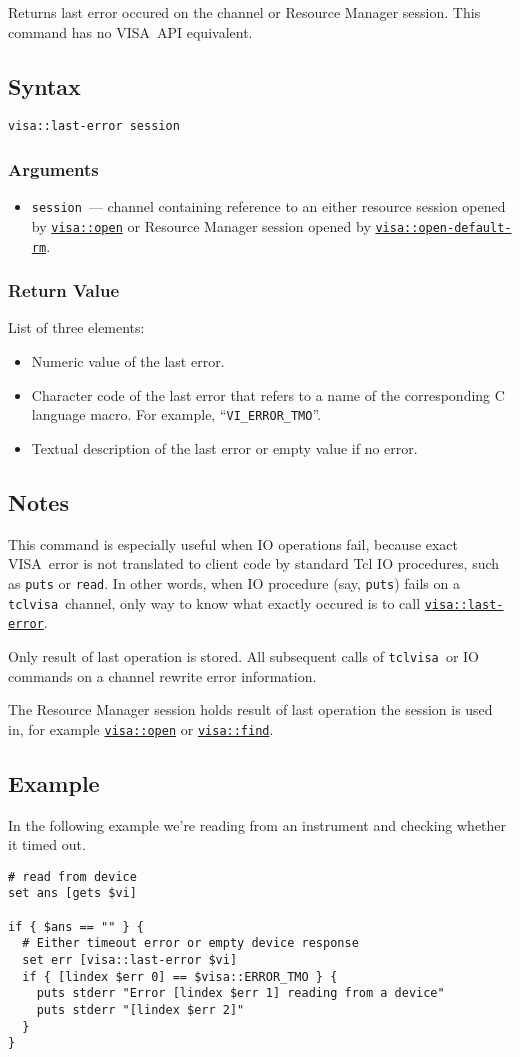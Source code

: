 \documentclass[12pt, a4paper]{report}
\newcommand{\tclvisa}{{\tt tclvisa }}
\newcommand{\VISA}{\mbox{VISA }}
\newcommand{\COMMANDREF}[1]{{\tt \hyperref[#1]{#1}}}
\newcommand{\TCLCOMMANDREF}[1]{{\tt \mbox{#1}}\index{#1}}
\newcommand{\EXAMPLE}{\subsection*{Example}}
\newcommand{\SYNTAX}[1]{\subsection*{Syntax}{\tt #1}}
\newcommand{\NOTES}{\subsection*{Notes}}
\newcommand{\ARGUMENTS}{\subsubsection*{Arguments}}
\newcommand{\RETURN}{\subsubsection*{Return Value}}
\newcommand{\BEGINARGUMENTS}{\ARGUMENTS\begin{itemize}}
\newcommand{\ENDARGUMENTS}{\end{itemize}}
\newcommand{\ARGUMENT}[1]{\item {\tt \mbox{#1}}~---}
\begin{document}
Returns last error occured on the channel or Resource Manager session. This command has no \VISA API equivalent.

\SYNTAX{visa::last-error session}

\BEGINARGUMENTS
\ARGUMENT{session} channel containing reference to an either resource session opened by \COMMANDREF{visa::open} or Resource Manager session opened by \COMMANDREF{visa::open-default-rm}.
\ENDARGUMENTS

\RETURN

List of three elements:

\begin{itemize}
\item Numeric value of the last error.
\item Character code of the last error that refers to a name of the corresponding C language macro. For example, ``{\tt VI\_ERROR\_TMO}''.
\item Textual description of the last error or empty value if no error.
\end{itemize}

\NOTES

This command is especially useful when IO operations fail, because exact \VISA error is not translated to client code by standard Tcl IO procedures, such as \TCLCOMMANDREF{puts} or \TCLCOMMANDREF{read}. In other words, when IO procedure (say, \TCLCOMMANDREF{puts}) fails on a \tclvisa channel, only way to know what exactly occured is to call \COMMANDREF{visa::last-error}.

Only result of last operation is stored. All subsequent calls of \tclvisa or IO commands on a channel rewrite error information.

The Resource Manager session holds result of last operation the session is used in, for example \COMMANDREF{visa::open} or \COMMANDREF{visa::find}.

\EXAMPLE

In the following example we're reading from an instrument and checking whether it timed out.

\begin{verbatim} 
# read from device
set ans [gets $vi]

if { $ans == "" } {
  # Either timeout error or empty device response
  set err [visa::last-error $vi]
  if { [lindex $err 0] == $visa::ERROR_TMO } {
    puts stderr "Error [lindex $err 1] reading from a device"
    puts stderr "[lindex $err 2]"
  }
}
\end{verbatim} 
\end{document}
